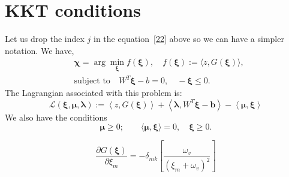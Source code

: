 \documentclass[12pt]{amsart}
\theoremstyle{definition}
\begin{document}
\section{KKT conditions}
Let us drop the index $j$ in the equation~\eqref{22} above so we can have a simpler notation. We have,
\begin{equation}
    \begin{aligned}
        &\bm \chi=\arg\min_{\bm{\xi}}f(\bm{\xi}),\quad f(\bm\xi):=\langle z,G(\bm{\xi})\rangle, \\
                &\mbox{subject to}\quad W^T \bm{\xi}-b=0, \quad -\bm{\xi}\le 0.
    \end{aligned}
\end{equation}
The Lagrangian associated with this problem is:
\begin{equation}\label{lagrange-0}
\mathcal{L}(\bm{\xi},\bm{\mu},\bm{\lambda}):=
\left\langle z, G(\bm{\xi})\right\rangle+
\left\langle \bm \lambda, W^T\bm{\xi}-\bm{b}\right\rangle-
\left\langle \bm \mu, \bm{\xi}\right\rangle
\end{equation}
We also have the conditions
\begin{equation}\label{cond-lagrange}
    \bm\mu \ge 0; \qquad \langle\bm\mu,\bm \xi\rangle =0 ,\quad \bm{\xi}\ge 0.
\end{equation}

\begin{equation}
    \frac{\partial G(\bm{\xi})}{\partial \xi_m} = -\delta_{mk}\left[\frac{\omega_v}{(\xi_m+\omega_v)^2}\right] 
\end{equation}
\end{document}

